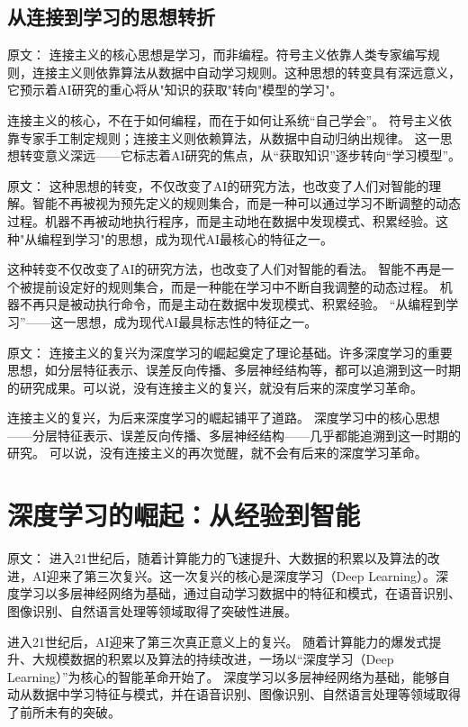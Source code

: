 \subsection{从连接到学习的思想转折}

原文：
连接主义的核心思想是学习，而非编程。符号主义依靠人类专家编写规则，连接主义则依靠算法从数据中自动学习规则。这种思想的转变具有深远意义，它预示着AI研究的重心将从"知识的获取"转向"模型的学习"。

连接主义的核心，不在于如何编程，而在于如何让系统“自己学会”。  
符号主义依靠专家手工制定规则；连接主义则依赖算法，从数据中自动归纳出规律。  
这一思想转变意义深远——它标志着AI研究的焦点，从“获取知识”逐步转向“学习模型”。

原文：
这种思想的转变，不仅改变了AI的研究方法，也改变了人们对智能的理解。智能不再被视为预先定义的规则集合，而是一种可以通过学习不断调整的动态过程。机器不再被动地执行程序，而是主动地在数据中发现模式、积累经验。这种"从编程到学习"的思想，成为现代AI最核心的特征之一。

这种转变不仅改变了AI的研究方法，也改变了人们对智能的看法。  
智能不再是一个被提前设定好的规则集合，而是一种能在学习中不断自我调整的动态过程。  
机器不再只是被动执行命令，而是主动在数据中发现模式、积累经验。  
“从编程到学习”——这一思想，成为现代AI最具标志性的特征之一。

原文：
连接主义的复兴为深度学习的崛起奠定了理论基础。许多深度学习的重要思想，如分层特征表示、误差反向传播、多层神经结构等，都可以追溯到这一时期的研究成果。可以说，没有连接主义的复兴，就没有后来的深度学习革命。

连接主义的复兴，为后来深度学习的崛起铺平了道路。  
深度学习中的核心思想——分层特征表示、误差反向传播、多层神经结构——几乎都能追溯到这一时期的研究。  
可以说，没有连接主义的再次觉醒，就不会有后来的深度学习革命。

\section{深度学习的崛起：从经验到智能}

原文：
进入21世纪后，随着计算能力的飞速提升、大数据的积累以及算法的改进，AI迎来了第三次复兴。这一次复兴的核心是深度学习（Deep Learning）。深度学习以多层神经网络为基础，通过自动学习数据中的特征和模式，在语音识别、图像识别、自然语言处理等领域取得了突破性进展。

进入21世纪后，AI迎来了第三次真正意义上的复兴。  
随着计算能力的爆发式提升、大规模数据的积累以及算法的持续改进，一场以“深度学习（Deep Learning）”为核心的智能革命开始了。  
深度学习以多层神经网络为基础，能够自动从数据中学习特征与模式，并在语音识别、图像识别、自然语言处理等领域取得了前所未有的突破。

